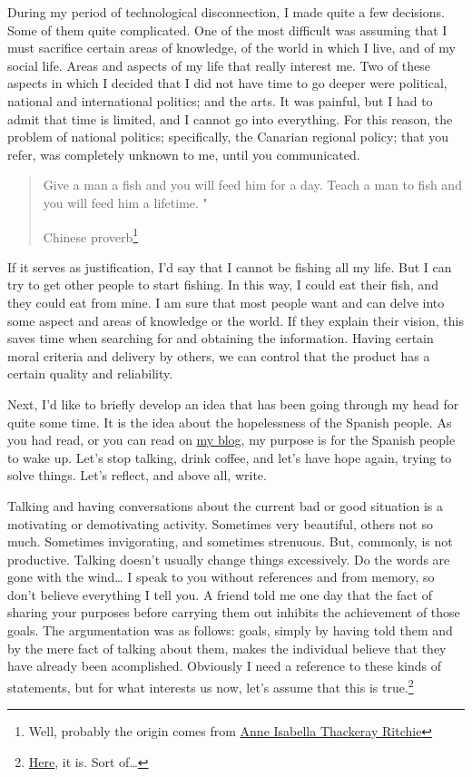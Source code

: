 \documentclass[]{book}
\let\rmarkdownfootnote\footnote%
\def\footnote{\protect\rmarkdownfootnote}
\begin{document}
During my period of technological disconnection, I made quite a few decisions. Some of them quite complicated. One of the most difficult was assuming that I must sacrifice certain areas of knowledge, of the world in which I live, and of my social life. Areas and aspects of my life that really interest me. Two of these aspects in which I decided that I did not have time to go deeper were political, national and international politics; and the arts. It was painful, but I had to admit that time is limited, and I cannot go into everything. For this reason, the problem of national politics; specifically, the Canarian regional policy; that you refer, was completely unknown to me, until you communicated.

\begin{quote}
Give a man a fish and you will feed him for a day. Teach a man to fish and you will feed him a lifetime. "

Chinese proverb\footnote{Well, probably the origin comes from \href{https://quoteinvestigator.com/2015/08/28/fish/}{Anne Isabella Thackeray Ritchie} }
\end{quote}

If it serves as justification, I'd say that I cannot be fishing all my life. But I can try to get other people to start fishing. In this way, I could eat their fish, and they could eat from mine. I am sure that most people want and can delve into some aspect and areas of knowledge or the world. If they explain their vision, this saves time when searching for and obtaining the information. Having certain moral criteria and delivery by others, we can control that the product has a certain quality and reliability.

Next, I'd like to briefly develop an idea that has been going through my head for quite some time. It is the idea about the hopelessness of the Spanish people. As you had read, or you can read on \href{https://excusasparanovolver.blogspot.com/2014/01/handwritten-eso-es-lo-importante.html}{my blog}, my purpose is for the Spanish people to wake up. Let's stop talking, drink coffee, and let's have hope again, trying to solve things. Let's reflect, and above all, write.

Talking and having conversations about the current bad or good situation is a motivating or demotivating activity. Sometimes very beautiful, others not so much. Sometimes invigorating, and sometimes strenuous. But, commonly, is not productive. Talking doesn't usually change things excessively. Do the words are gone with the wind\ldots{} I speak to you without references and from memory, so don't believe everything I tell you. A friend told me one day that the fact of sharing your purposes before carrying them out inhibits the achievement of those goals. The argumentation was as follows: goals, simply by having told them and by the mere fact of talking about them, makes the individual believe that they have already been acomplished. Obviously I need a reference to these kinds of statements, but for what interests us now, let's assume that this is true.\footnote{\href{https://blog.trello.com/science-backed-reasons-you-shouldnt-share-your-goals}{Here}, it is. Sort of\ldots{}}
\end{document}
